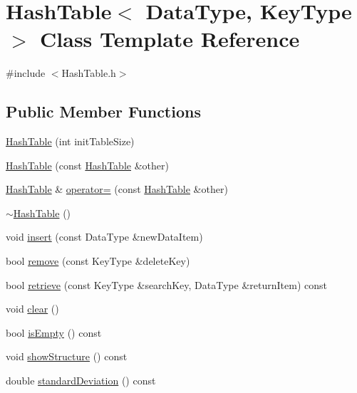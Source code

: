 \hypertarget{class_hash_table}{\section{\-Hash\-Table$<$ \-Data\-Type, \-Key\-Type $>$ \-Class \-Template \-Reference}
\label{class_hash_table}
}


{\ttfamily \#include $<$\-Hash\-Table.\-h$>$}

\subsection*{\-Public \-Member \-Functions}
\begin{DoxyCompactItemize}
\item 
\hyperlink{class_hash_table_a103b09f30dbac0fe92fc2f1192feb0c1}{\-Hash\-Table} (int init\-Table\-Size)
\item 
\hyperlink{class_hash_table_a5da00f8a0dc9dc745675a96eac228049}{\-Hash\-Table} (const \hyperlink{class_hash_table}{\-Hash\-Table} \&other)
\item 
\hyperlink{class_hash_table}{\-Hash\-Table} \& \hyperlink{class_hash_table_add76a73a92b81a2d54c20078d4a76546}{operator=} (const \hyperlink{class_hash_table}{\-Hash\-Table} \&other)
\item 
\hyperlink{class_hash_table_ae25eb9c66b9bce8c9c04f18e22688a15}{$\sim$\-Hash\-Table} ()
\item 
void \hyperlink{class_hash_table_adc8f2be061729bdc5ecb171b54304e17}{insert} (const \-Data\-Type \&new\-Data\-Item)
\item 
bool \hyperlink{class_hash_table_a46d3f8ad70fd80dc7aa64f50676ef7a5}{remove} (const \-Key\-Type \&delete\-Key)
\item 
bool \hyperlink{class_hash_table_ad4ee3ff641daa330260a48de29492e66}{retrieve} (const \-Key\-Type \&search\-Key, \-Data\-Type \&return\-Item) const 
\item 
void \hyperlink{class_hash_table_a57f581334e35d45a8822c03edc0fcca6}{clear} ()
\item 
bool \hyperlink{class_hash_table_a101e211a7fca37cd90722e15df2fc571}{is\-Empty} () const 
\item 
void \hyperlink{class_hash_table_a8b875e57f71a5bbba394e42361fb9fb4}{show\-Structure} () const 
\item 
double \hyperlink{class_hash_table_a4db2d920fd7c632f5b4b1bacd503bbf1}{standard\-Deviation} () const 
\end{DoxyCompactItemize}

